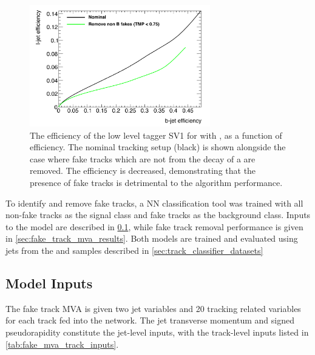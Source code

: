 \begin{figure}[!htbp]
    \centering
    \includegraphics[width=0.7\textwidth]{chapters/track_classifier/figs/sv1_perf_nofake.pdf}
    \caption{
      The \ljet efficiency of the low level tagger SV1 for \Zprimejets with \Zprimept, as a function of \bjet efficiency.
      The nominal tracking setup (black) is shown alongside the case where fake tracks which are not from the decay of a \bhadron are removed.
      The \ljet efficiency is decreased, demonstrating that the presence of fake tracks is detrimental to the algorithm performance.
    }
    \label{fig:sv1_perf_nofake}
\end{figure}

To identify and remove fake tracks, a NN classification tool was trained with all non-fake tracks as the signal class and fake tracks as the background class.
Inputs to the model are described in \cref{sec:fake_mva_model_inputs}, while fake track removal performance is given in \cref{sec:fake_track_mva_results}.
Both models are trained and evaluated using jets from the \ttbar and \Zprime samples described in \cref{sec:track_classifier_datasets}


\subsection{Model Inputs}\label{sec:fake_mva_model_inputs}


The fake track MVA is given two jet variables and 20 tracking related variables for each track fed into the network.
The jet transverse momentum and signed pseudorapidity constitute the jet-level inputs, with the track-level inputs listed in \cref{tab:fake_mva_track_inputs}.


